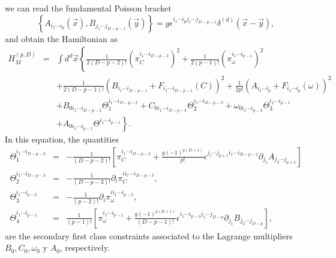 \documentclass[a4paper,12pt]{article}
\renewcommand{\sup}[1]{^{(#1)}}
\begin{document}
we can read the fundamental Poisson bracket
\begin{equation}
\left\{A_{i_1\cdots i_p}(\vec x),B_{j_1\cdots j_{D-p-1}}
(\vec y)\right\}=
g\epsilon^{i_1\cdots i_pj_1\cdots j_{D-p-1}}
\delta\sup d(\vec x-\vec y),\label{Alg-MasLoc}
\end{equation}
and obtain the Hamiltonian as
\begin{eqnarray}
H_M\sup{p,D}&=&\int d^d\vec x\left\{\frac 1{2(D-p-2)!}\left(\pi_C^{i_1\cdots i_{D-p-2}}\right)^2+
\frac 1{2(p-1)!}
\left(\pi_\omega^{i_1\cdots i_{p-1}}\right)^2\right.\nonumber\\
            &&+\frac 1{2(D-p-1)!}
\left(B_{i_1\cdots i_{D-p-1}}+F_{i_1\cdots i_{D-p-1}}(C)\right)^2+
\frac 1{2p!}\left(A_{i_1\cdots i_p}+
F_{i_1\cdots i_p}(\omega)\right)^2\nonumber\\
            &&+B_{0i_1\cdots i_{D-p-2}}
\Theta_1^{i_1\cdots i_{D-p-2}}+
C_{0i_1\cdots i_{D-p-3}}
\Theta_2^{i_1\cdots i_{D-p-3}}+
\omega_{0i_1\cdots i_{p-2}}\Theta_3^{i_1\cdots i_{p-1}}\nonumber\\
            &&\left.+A_{0i_1\cdots i_{p-1}}
\Theta^{i_1\cdots i_{p-1}}\right\}.
\end{eqnarray}
In this equation, the quantities
\begin{eqnarray}
\Theta_1^{i_1\cdots i_{D-p-2}}&=&-\frac 1{(D-p-2)!}
\left[\pi_C^{i_1\cdots i_{D-p-2}}+\frac{g(-1)^{p(D+1)}}{p!}
\epsilon^{j_1\cdots j_{p+1}i_1\cdots i_{D-p-2}}
\partial_{j_1}A_{j_2\cdots j_{p+1}}\right]\nonumber\\
\Theta_2^{i_1\cdots i_{D-p-3}}&=&-\frac 1{(D-p-3)!}\partial_i\pi_C^{ii_1\cdots i_{D-p-3}},\nonumber\\
\Theta_3^{i_1\cdots i_{p-2}}&=&
-\frac 1{(p-2)!}\partial_i\pi_\omega^{ii_1\cdots i_{p-2}},\\
\Theta_4^{i_1\cdots i_{p-1}}&=&
\frac 1{(p-1)!}\left[\pi_\omega^{i_1\cdots i_{p-1}}+
\frac{g(-1)^{p(D+1)}}{(D-p-1)!}
\epsilon^{i_1\cdots i_{p-1}j_1\cdots j_{D-p}}
\partial_{j_1}B_{j_2\cdots j_{D-p}}\right],
\end{eqnarray}
are the secondary first class constraints associated to the
Lagrange multipliers $B_0,C_0,\omega_0$ y $A_0$, respectively.
\end{document}
